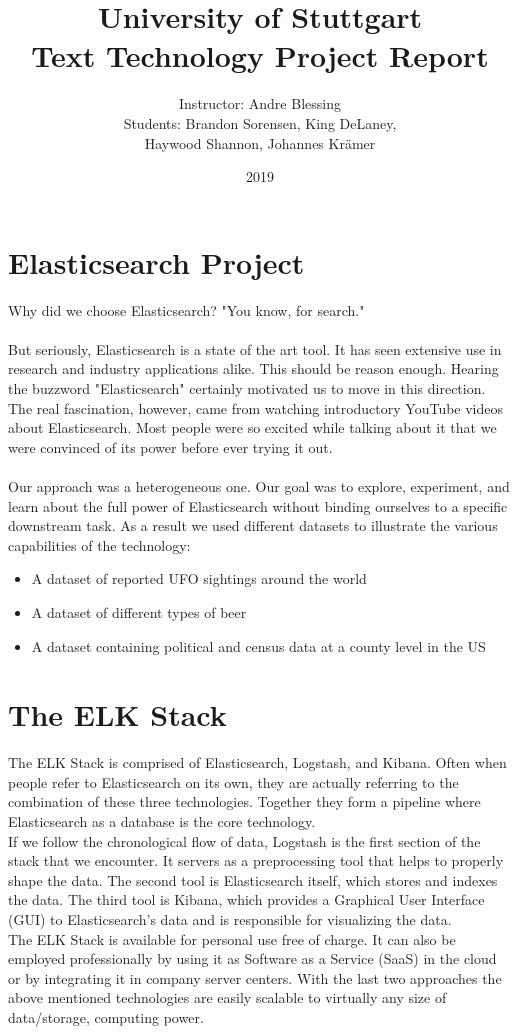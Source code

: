 \documentclass[bibliography=totoc]{article}
\title{University of Stuttgart \vspace{1em}\\Text Technology Project Report}
\author{Instructor: Andre Blessing\\Students: Brandon Sorensen, King DeLaney, \\Haywood Shannon, Johannes Krämer}
\date{2019}
\begin{document}
\maketitle


\section{Elasticsearch Project}
Why did we choose Elasticsearch? "You know, for search."
\\
\\
But seriously, Elasticsearch is a state of the art tool. It has seen extensive use in 
research and industry applications alike. This should be reason enough. Hearing the buzzword "Elasticsearch" 
certainly motivated us to move in this direction. The real fascination, however, came from watching
introductory YouTube videos about Elasticsearch. Most people were so excited while talking about it that we  were convinced of its power before ever trying it out.
\\  
\\
Our approach was a heterogeneous one. Our goal was to explore, experiment, and learn about the full power of 
Elasticsearch without binding ourselves to a specific downstream task.
As a result we used different datasets to illustrate the various capabilities of the technology:
\begin{itemize}
  \item A dataset of reported UFO sightings around the world
  \item A dataset of different types of beer
  \item A dataset containing political and census data at a county level in the US
\end{itemize}

\section{The ELK Stack}
The ELK Stack is comprised of Elasticsearch, Logstash, and Kibana.
Often when people refer to Elasticsearch on its own, they are actually referring to
the combination of these three technologies. Together they form a pipeline where
Elasticsearch as a database is the core technology.
\\
If we follow the chronological flow of data, Logstash is the first section of the
stack that we encounter. It servers as a preprocessing tool that helps to properly shape the data.
The second tool is Elasticsearch itself, which stores and indexes the data.
The third tool is Kibana, which provides a Graphical User Interface (GUI) to Elasticsearch's data 
and is responsible for visualizing the data. 
\\
The ELK Stack is available for personal use free of charge. It can also be 
employed professionally by using it as Software as a Service (SaaS) in the cloud
or by integrating it in company server centers. With the last two approaches 
the above mentioned technologies are easily scalable to virtually any size of data/storage,
computing power.
\end{document}
